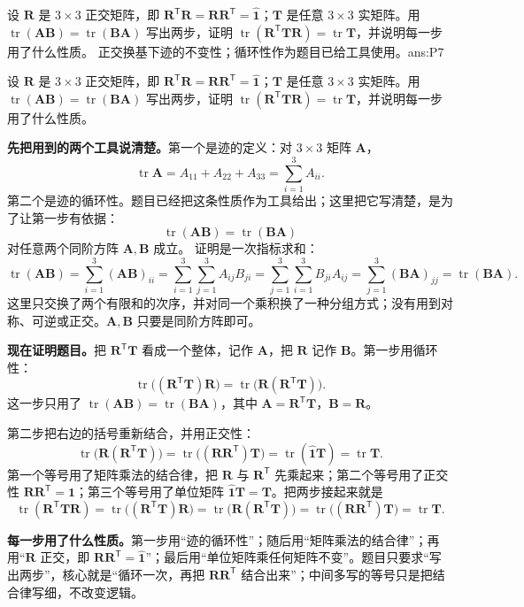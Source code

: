 \documentclass[11pt]{ctexart}
\newcommand{\ten}[1]{\mathbf{#1}}
\newcommand{\unitd}{\hat{\ten{1}}}
\newcommand{\tr}{\operatorname{tr}}
\let\orighdr\hdr
\renewcommand{\hdr}[2]{\par\needspace{10\baselineskip}\orighdr{#1}{#2}}
\begin{document}
{设 $\ten R$ 是 $3\times3$ 正交矩阵，即 $\ten R^{\mathsf T}\ten R=\ten R\ten R^{\mathsf T}=\unitd$；$\ten T$ 是任意 $3\times3$ 实矩阵。用 $\tr(\ten A\ten B)=\tr(\ten B\ten A)$ 写出两步，证明 $\tr(\ten R^{\mathsf T}\ten T\ten R)=\tr\ten T$，并说明每一步用了什么性质。}
{正交换基下迹的不变性；循环性作为题目已给工具使用。}{ans:P7}

\clearpage
\appendix
{}

{设 $\ten R$ 是 $3\times3$ 正交矩阵，即 $\ten R^{\mathsf T}\ten R=\ten R\ten R^{\mathsf T}=\unitd$；$\ten T$ 是任意 $3\times3$ 实矩阵。用 $\tr(\ten A\ten B)=\tr(\ten B\ten A)$ 写出两步，证明 $\tr(\ten R^{\mathsf T}\ten T\ten R)=\tr\ten T$，并说明每一步用了什么性质。}

\textbf{先把用到的两个工具说清楚。}第一个是迹的定义：对 $3\times3$ 矩阵 $\ten A$，
\[
\tr\ten A=A_{11}+A_{22}+A_{33}=\sum_{i=1}^{3}A_{ii}.
\]
第二个是迹的循环性。题目已经把这条性质作为工具给出；这里把它写清楚，是为了让第一步有依据：
\[
\tr(\ten A\ten B)=\tr(\ten B\ten A)
\]
对任意两个同阶方阵 $\ten A,\ten B$ 成立。
证明是一次指标求和：
\[
\tr(\ten A\ten B)
=\sum_{i=1}^{3}(\ten A\ten B)_{ii}
=\sum_{i=1}^{3}\sum_{j=1}^{3}A_{ij}B_{ji}
=\sum_{j=1}^{3}\sum_{i=1}^{3}B_{ji}A_{ij}
=\sum_{j=1}^{3}(\ten B\ten A)_{jj}
=\tr(\ten B\ten A).
\]
这里只交换了两个有限和的次序，并对同一个乘积换了一种分组方式；没有用到对称、可逆或正交。$\ten A,\ten B$ 只要是同阶方阵即可。

\textbf{现在证明题目。}把 $\ten R^{\mathsf T}\ten T$ 看成一个整体，记作 $\ten A$，把 $\ten R$ 记作 $\ten B$。第一步用循环性：
\[
\tr\bigl((\ten R^{\mathsf T}\ten T)\ten R\bigr)
=\tr\bigl(\ten R(\ten R^{\mathsf T}\ten T)\bigr).
\]
这一步只用了 $\tr(\ten A\ten B)=\tr(\ten B\ten A)$，其中 $\ten A=\ten R^{\mathsf T}\ten T$，$\ten B=\ten R$。

第二步把右边的括号重新结合，并用正交性：
\[
\tr\bigl(\ten R(\ten R^{\mathsf T}\ten T)\bigr)
=\tr\bigl((\ten R\ten R^{\mathsf T})\ten T\bigr)
=\tr(\unitd\ten T)
=\tr\ten T .
\]
第一个等号用了矩阵乘法的结合律，把 $\ten R$ 与 $\ten R^{\mathsf T}$ 先乘起来；第二个等号用了正交性 $\ten R\ten R^{\mathsf T}=\unitd$；第三个等号用了单位矩阵 $\unitd\ten T=\ten T$。把两步接起来就是
\[
\tr(\ten R^{\mathsf T}\ten T\ten R)
=\tr\bigl((\ten R^{\mathsf T}\ten T)\ten R\bigr)
=\tr\bigl(\ten R(\ten R^{\mathsf T}\ten T)\bigr)
=\tr\bigl((\ten R\ten R^{\mathsf T})\ten T\bigr)
=\tr\ten T .
\]

\textbf{每一步用了什么性质。}第一步用“迹的循环性”；随后用“矩阵乘法的结合律”；再用“$\ten R$ 正交，即 $\ten R\ten R^{\mathsf T}=\unitd$”；最后用“单位矩阵乘任何矩阵不变”。题目只要求“写出两步”，核心就是“循环一次，再把 $\ten R\ten R^{\mathsf T}$ 结合出来”；中间多写的等号只是把结合律写细，不改变逻辑。
\end{document}

